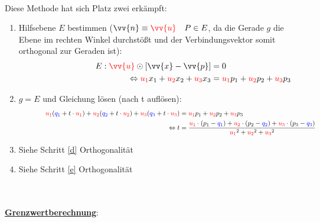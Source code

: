             \paragraph{} Diese Methode hat sich Platz zwei erkämpft:
                \begin{enumerate}[1)]
                    \item Hilfsebene $E$ bestimmen ($\vv{n}\equiv\textcolor{red}{\vv{u}}\quad P\in E$, da die Gerade $g$ die Ebene im rechten Winkel durchstößt und
                    der Verbindungsvektor somit orthogonal zur Geraden ist):
                    \begin{align*}
                        \qquad \qquad \qquad \qquad E:\textcolor{red}{\vv{u}} \odot [\vv{x} - \vv{p}] &= 0 \\
                                                    \Leftrightarrow \textcolor{red}{u_1}x_1 + \textcolor{red}{u_2}x_2 + \textcolor{red}{u_3}x_3 &= \textcolor{red}{u_1}p_1 + \textcolor{red}{u_2}p_2 + \textcolor{red}{u_3}p_3
                    \end{align*}
                    \item $g = E$ und Gleichung lösen (nach t auflösen):
                    \begin{align*}
                        \qquad \qquad \textcolor{red}{u_1}(\textcolor{blue}{q_1} + t \cdot \textcolor{red}{u_1}) + \textcolor{red}{u_2}(\textcolor{blue}{q_2}+t\cdot \textcolor{red}{u_2}) + \textcolor{red}{u_3}(\textcolor{blue}{q_3}+t\cdot \textcolor{red}{u_3}) &= \textcolor{red}{u_1}p_1 + \textcolor{red}{u_2}p_2 + \textcolor{red}{u_3}p_3 \\
                        \Leftrightarrow t &= \dfrac{\textcolor{red}{u_1} \cdot (p_1 - \textcolor{blue}{q_1}) + \textcolor{red}{u_2} \cdot (p_2 - \textcolor{blue}{q_2}) + \textcolor{red}{u_3} \cdot (p_3 - \textcolor{blue}{q_3})}{\textcolor{red}{u_1}^2 + \textcolor{red}{u_2}^2 + \textcolor{red}{u_3}^2}
                    \end{align*}
                    \item Siehe Schritt \ref{d} Orthogonalität
                    \item Siehe Schritt \ref{e} Orthogonalität
                \end{enumerate}

        \\
        \\
        \underline{\textbf{Grenzwertberechnung}}:
